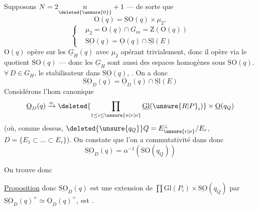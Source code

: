 Supposons $N=2\underset{\deleted{\unsure{0}}}{n}+1$ --- de sorte que
\[
\mathrm O(q)=\mathrm{SO}(q)\times\mu_2,
\]
 
\[
\left\{\begin{aligned}
&\mu_2=\mathrm O(q)\cap G_m=\mathrm Z(\mathrm O(q))\\
&\underline{\mathrm{SO}}(q)=\underline{\mathrm O}(q)\cap\underline{\mathrm{Sl}}(E)
\end{aligned}\right.
\]
  $\mathrm O(q)$ opère sur les $\underline G_H(q)$ avec $\mu_2$ opérant trivialement, donc il opère via le quotient $\mathrm{SO}(q)$ --- donc les $\underline G_H$ sont aussi des espaces homogènes sous $\mathrm{SO}(q)$.    $\forall\,D\in G_H$,  le stabilisateur dans $\underline{\mathrm{SO}}(q)$, . On a donc
\[
\underline{\mathrm{SO}}_D(q)=\underline{\mathrm O}_D(q)\cap\underline{\mathrm{Sl}}(E)
\]
Considérons l'hom canonique
\[
\underline{\mathrm O}_D(q)\xrightarrow{\alpha}\deleted{\prod_{1\leq i\leq\unsure{n|r|\nu}}\underline{\mathrm{Gl}}(\unsure{R|P}_i)}\times\underline{\mathrm O}(q_Q)
\]
(où, comme dessus, $\deleted{\unsure{q_Q}}Q=E_{\unsure{r|\nu}}^\perp/E_r$, $D=\{E_1\subset\ldots\subset E_r\}$). On constate que
l'on a commutativité dans
donc
\[
\underline{\mathrm{SO}}_D(q)=\alpha^{-1}(\mathrm{SO}(q_Q))
\]

On trouve donc

\uline{Proposition}      
donc $\underline{\mathrm{SO}}_D(q)$ est une extension de $\prod\mathrm{Gl}(P_i)\times\underline{\mathrm{SO}}(q_Q)$ par $\underline{\mathrm{SO}}_D(q)^+\simeq\underline{\mathrm O}_D(q)^+$,   est  .

